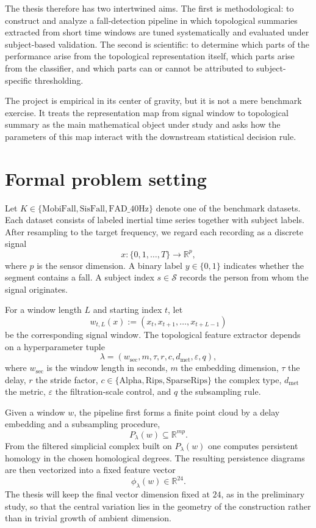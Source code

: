 \documentclass[11pt]{article}
\newcommand{\R}{\mathbb R}
\newcommand{\1}{\mathbf 1}
\newcommand{\Sset}{\mathcal S}
\begin{document}
The thesis therefore has two intertwined aims. The first is methodological: to construct and analyze a fall-detection pipeline in which topological summaries extracted from short time windows are tuned systematically and evaluated under subject-based validation. The second is scientific: to determine which parts of the performance arise from the topological representation itself, which parts arise from the classifier, and which parts can or cannot be attributed to subject-specific thresholding.

The project is empirical in its center of gravity, but it is not a mere benchmark exercise. It treats the representation map from signal window to topological summary as the main mathematical object under study and asks how the parameters of this map interact with the downstream statistical decision rule.

\section{Formal problem setting}

Let $K\in\{\mathrm{MobiFall},\mathrm{SisFall},\mathrm{FAD\_40Hz}\}$ denote one of the benchmark datasets. Each dataset consists of labeled inertial time series together with subject labels. After resampling to the target frequency, we regard each recording as a discrete signal
\[
  x\colon \{0,1,\dots,T\}\longrightarrow \R^p,
\]
where $p$ is the sensor dimension. A binary label $y\in\{0,1\}$ indicates whether the segment contains a fall. A subject index $s\in\Sset$ records the person from whom the signal originates.

For a window length $L$ and starting index $t$, let
\[
  w_{t,L}(x):=(x_t,x_{t+1},\dots,x_{t+L-1})
\]
be the corresponding signal window. The topological feature extractor depends on a hyperparameter tuple
\[
  \lambda=(w_{\mathrm{sec}},m,\tau,r,c,d_{\mathrm{met}},\varepsilon,q),
\]
where $w_{\mathrm{sec}}$ is the window length in seconds, $m$ the embedding dimension, $\tau$ the delay, $r$ the stride factor, $c\in\{\mathrm{Alpha},\mathrm{Rips},\mathrm{SparseRips}\}$ the complex type, $d_{\mathrm{met}}$ the metric, $\varepsilon$ the filtration-scale control, and $q$ the subsampling rule.

Given a window $w$, the pipeline first forms a finite point cloud by a delay embedding and a subsampling procedure,
\[
  P_\lambda(w)\subseteq \R^{mp}.
\]
From the filtered simplicial complex built on $P_\lambda(w)$ one computes persistent homology in the chosen homological degrees. The resulting persistence diagrams are then vectorized into a fixed feature vector
\[
  \phi_\lambda(w)\in \R^{24}.
\]
The thesis will keep the final vector dimension fixed at $24$, as in the preliminary study, so that the central variation lies in the geometry of the construction rather than in trivial growth of ambient dimension.
\end{document}
